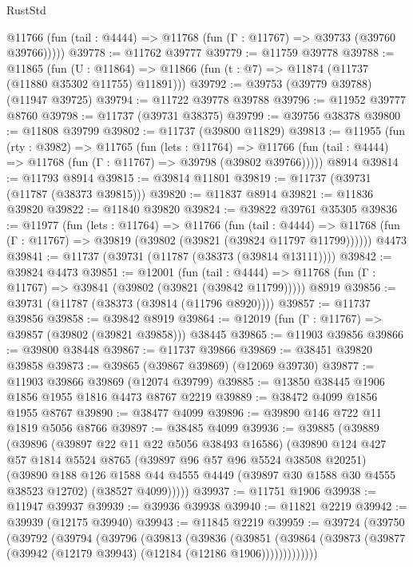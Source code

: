 \begin{lexlean}{RustStd}
\begin{coremodule}
      @11766 (fun (tail : @4444) => @11768 (fun (Γ : @11767) => @39733 (@39760 @39766)))))
@39778 := @11762 @39777
@39779 := @11759 @39778
@39788 := @11865
    (fun (U : @11864) => @11866 (fun (t : @7) => @11874 (@11737 (@11880 @35302 @11755) @11891)))
@39792 := @39753 (@39779 @39788) (@11947 @39725)
@39794 := @11722 @39778 @39788
@39796 := @11952 @39777 @8760
@39798 := @11737 (@39731 @38375)
@39799 := @39756 @38378
@39800 := @11808 @39799
@39802 := @11737 (@39800 @11829)
@39813 := @11955
    (fun (rty : @3982) =>
    @11765
      (fun (lets : @11764) =>
      @11766 (fun (tail : @4444) => @11768 (fun (Γ : @11767) => @39798 (@39802 @39766)))))
    @8914
@39814 := @11793 @8914
@39815 := @39814 @11801
@39819 := @11737 (@39731 (@11787 (@38373 @39815)))
@39820 := @11837 @8914
@39821 := @11836 @39820
@39822 := @11840 @39820
@39824 := @39822 @39761 @35305
@39836 := @11977
    (fun (lets : @11764) =>
    @11766
      (fun (tail : @4444) =>
      @11768 (fun (Γ : @11767) => @39819 (@39802 (@39821 (@39824 @11797 @11799))))))
    @4473
@39841 := @11737 (@39731 (@11787 (@38373 (@39814 @13111))))
@39842 := @39824 @4473
@39851 := @12001
    (fun (tail : @4444) => @11768 (fun (Γ : @11767) => @39841 (@39802 (@39821 (@39842 @11799)))))
    @8919
@39856 := @39731 (@11787 (@38373 (@39814 (@11796 @8920))))
@39857 := @11737 @39856
@39858 := @39842 @8919
@39864 := @12019 (fun (Γ : @11767) => @39857 (@39802 (@39821 @39858))) @38445
@39865 := @11903 @39856
@39866 := @39800 @38448
@39867 := @11737 @39866
@39869 := @38451 @39820 @39858
@39873 := @39865 (@39867 @39869) (@12069 @39730)
@39877 := @11903 @39866 @39869 (@12074 @39799)
@39885 := @13850 @38445 @1906 @1856 @1955 @1816 @4473 @8767 @2219
@39889 := @38472 @4099 @1856 @1955 @8767
@39890 := @38477 @4099
@39896 := @39890 @146 @722 @11 @1819 @5056 @8766
@39897 := @38485 @4099
@39936 := @39885
    (@39889
      (@39896
        (@39897 @22 @11 @22 @5056 @38493 @16586)
        (@39890
          @124
          @427
          @57
          @1814
          @5524
          @8765
          (@39897 @96 @57 @96 @5524 @38508 @20251)
          (@39890
            @188
            @126
            @1588
            @44
            @4555
            @4449
            (@39897 @30 @1588 @30 @4555 @38523 @12702)
            (@38527 @4099)))))
@39937 := @11751 @1906
@39938 := @11947 @39937
@39939 := @39936 @39938
@39940 := @11821 @2219
@39942 := @39939 (@12175 @39940)
@39943 := @11845 @2219
@39959 := @39724
    (@39750
      (@39792
        (@39794
          (@39796
            (@39813
              (@39836
                (@39851
                  (@39864 (@39873 (@39877 (@39942 (@12179 @39943) (@12184 (@12186 @1906)))))))))))))

\end{coremodule}
\end{lexlean}
